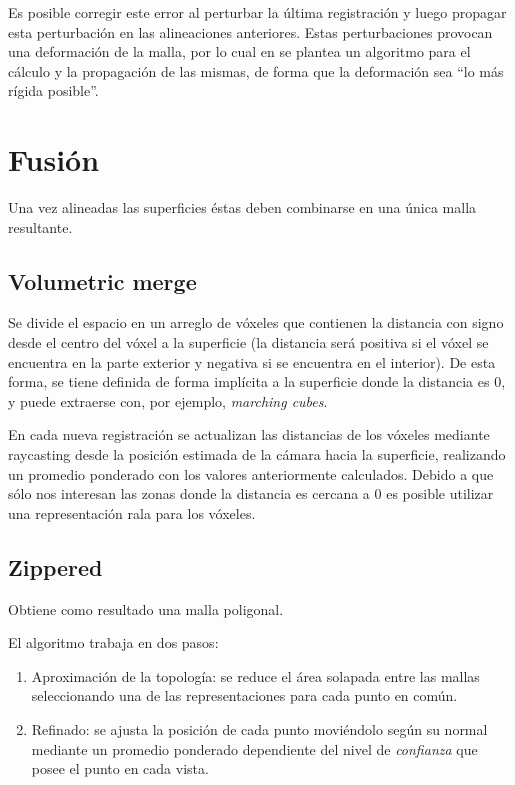 			Es posible corregir este error al perturbar la última registración
			y luego propagar esta perturbación en las alineaciones anteriores.
			Estas perturbaciones provocan una deformación de la malla, por lo
			cual
			en \cite{5457479}
			se plantea un algoritmo para el cálculo y la propagación de las
			mismas, de forma que la deformación sea ``lo más rígida posible''.

	\section{Fusión}
		Una vez alineadas las superficies éstas deben combinarse en una única malla resultante.

		\subsection{Volumetric merge}
		Se divide el espacio en un arreglo de vóxeles que contienen la
		distancia con signo desde el centro del vóxel a la superficie (la
		distancia será positiva si el vóxel se encuentra en la parte exterior y
		negativa si se encuentra en el interior).
		De esta forma,
		se tiene definida de forma implícita a la
		superficie donde la distancia es 0, y puede extraerse con, por ejemplo, \emph{marching cubes}.

		En cada nueva registración se actualizan las distancias de los
		vóxeles mediante raycasting
		desde la posición estimada de la cámara hacia la superficie,
		realizando un promedio ponderado con los valores anteriormente calculados.\cite{Curless:1996:VMB:237170.237269} %
		Debido a que sólo nos interesan las zonas donde la distancia es cercana a 0 es posible utilizar una representación rala para los vóxeles.\cite{Steinbrucker:2013:LMS:2586117.2586926} %


		\subsection{Zippered}
		Obtiene como resultado una malla poligonal.

		El algoritmo trabaja en dos pasos:
		\begin{enumerate}
			\item Aproximación de la topología: se reduce el área solapada
				entre las mallas seleccionando una de las representaciones para
				cada punto en común.
			\item Refinado: se ajusta la posición de cada punto moviéndolo
				según su normal mediante un promedio ponderado dependiente del
				nivel de \emph{confianza} que posee el punto en cada vista.\cite{Turk:1994:ZPM:192161.192241}
		\end{enumerate}

